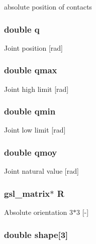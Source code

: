 absolute position of contacts \hypertarget{struct_stu_l_i_n_k_a5b5e3f03e443adea974601f295136638}{
\subsubsection[{q}]{\setlength{\rightskip}{0pt plus 5cm}double q}}\label{struct_stu_l_i_n_k_a5b5e3f03e443adea974601f295136638}
Joint position \mbox{[}rad\mbox{]} \hypertarget{struct_stu_l_i_n_k_a71e23e65ee4e5373126cee143f2831fa}{
\subsubsection[{qmax}]{\setlength{\rightskip}{0pt plus 5cm}double qmax}}\label{struct_stu_l_i_n_k_a71e23e65ee4e5373126cee143f2831fa}
Joint high limit \mbox{[}rad\mbox{]} \hypertarget{struct_stu_l_i_n_k_a5c81b5fed2f26bcd1252bdc55bb8f5ac}{
\subsubsection[{qmin}]{\setlength{\rightskip}{0pt plus 5cm}double qmin}}\label{struct_stu_l_i_n_k_a5c81b5fed2f26bcd1252bdc55bb8f5ac}
Joint low limit \mbox{[}rad\mbox{]} \hypertarget{struct_stu_l_i_n_k_a123207ffd54d9bd661c546c3a93d073f}{
\subsubsection[{qmoy}]{\setlength{\rightskip}{0pt plus 5cm}double qmoy}}\label{struct_stu_l_i_n_k_a123207ffd54d9bd661c546c3a93d073f}
Joint natural value \mbox{[}rad\mbox{]} \hypertarget{struct_stu_l_i_n_k_aa668961bd0b6248c88c0ee075be18b36}{
\subsubsection[{R}]{\setlength{\rightskip}{0pt plus 5cm}gsl\-\_\-matrix$\ast$ R}}\label{struct_stu_l_i_n_k_aa668961bd0b6248c88c0ee075be18b36}
Absolute orientation 3$\ast$3 \mbox{[}-\/\mbox{]} \hypertarget{struct_stu_l_i_n_k_addeb68e8573156d309bcecac3bdd7232}{
\subsubsection[{shape}]{\setlength{\rightskip}{0pt plus 5cm}double shape\mbox{[}3\mbox{]}}}\label{struct_stu_l_i_n_k_addeb68e8573156d309bcecac3bdd7232}

